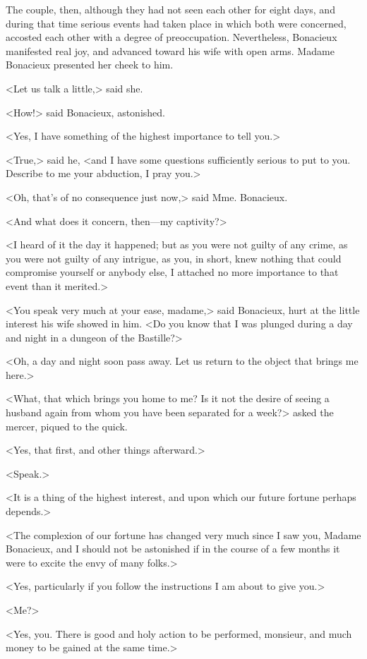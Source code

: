 The couple, then, although they had not seen each other for eight days, and during that time serious events had taken place in which both were concerned, accosted each other with a degree of preoccupation. Nevertheless, Bonacieux manifested real joy, and advanced toward his wife with open arms. Madame Bonacieux presented her cheek to him. 

<Let us talk a little,> said she. 

<How!> said Bonacieux, astonished. 

<Yes, I have something of the highest importance to tell you.> 

<True,> said he, <and I have some questions sufficiently serious to put to you. Describe to me your abduction, I pray you.> 

<Oh, that's of no consequence just now,> said Mme. Bonacieux. 

<And what does it concern, then---my captivity?> 

<I heard of it the day it happened; but as you were not guilty of any crime, as you were not guilty of any intrigue, as you, in short, knew nothing that could compromise yourself or anybody else, I attached no more importance to that event than it merited.> 

<You speak very much at your ease, madame,> said Bonacieux, hurt at the little interest his wife showed in him. <Do you know that I was plunged during a day and night in a dungeon of the Bastille?> 

<Oh, a day and night soon pass away. Let us return to the object that brings me here.> 

<What, that which brings you home to me? Is it not the desire of seeing a husband again from whom you have been separated for a week?> asked the mercer, piqued to the quick. 

<Yes, that first, and other things afterward.> 

<Speak.> 

<It is a thing of the highest interest, and upon which our future fortune perhaps depends.> 

<The complexion of our fortune has changed very much since I saw you, Madame Bonacieux, and I should not be astonished if in the course of a few months it were to excite the envy of many folks.> 

<Yes, particularly if you follow the instructions I am about to give you.> 

<Me?> 

<Yes, you. There is good and holy action to be performed, monsieur, and much money to be gained at the same time.> 

